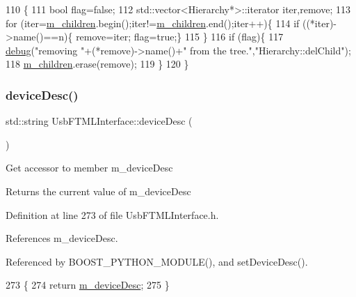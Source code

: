 \begin{DoxyCode}
110                                    \{
111   \textcolor{keywordtype}{bool} flag=\textcolor{keyword}{false};
112   std::vector<Hierarchy*>::iterator iter,\textcolor{keyword}{remove};
113   \textcolor{keywordflow}{for} (iter=\hyperlink{classHierarchy_a038816763941fd4a930504917f60483b}{m\_children}.begin();iter!=\hyperlink{classHierarchy_a038816763941fd4a930504917f60483b}{m\_children}.end();iter++)\{
114     \textcolor{keywordflow}{if} ((*iter)->name()==n)\{ \textcolor{keyword}{remove}=iter; flag=\textcolor{keyword}{true};\}
115   \}
116   \textcolor{keywordflow}{if} (flag)\{
117     \hyperlink{classObject_aac010553f022165573714b7014a15f0d}{debug}(\textcolor{stringliteral}{"removing "}+(*remove)->name()+\textcolor{stringliteral}{" from the tree."},\textcolor{stringliteral}{"Hierarchy::delChild"});
118     \hyperlink{classHierarchy_a038816763941fd4a930504917f60483b}{m\_children}.erase(\textcolor{keyword}{remove});
119   \}
120 \}
\end{DoxyCode}
\mbox{\label{classUsbFTMLInterface_ab541b4c57c1e7e947037acbfebc3fe3b}} 
\subsubsection{\texorpdfstring{device\+Desc()}{deviceDesc()}}
{\footnotesize\ttfamily std\+::string Usb\+F\+T\+M\+L\+Interface\+::device\+Desc (\begin{DoxyParamCaption}{ }\end{DoxyParamCaption})\hspace{0.3cm}{\ttfamily [inline]}}

Get accessor to member m\+\_\+device\+Desc \begin{DoxyReturn}{Returns}
the current value of m\+\_\+device\+Desc 
\end{DoxyReturn}


Definition at line 273 of file Usb\+F\+T\+M\+L\+Interface.\+h.



References m\+\_\+device\+Desc.



Referenced by B\+O\+O\+S\+T\+\_\+\+P\+Y\+T\+H\+O\+N\+\_\+\+M\+O\+D\+U\+L\+E(), and set\+Device\+Desc().


\begin{DoxyCode}
273                           \{
274     \textcolor{keywordflow}{return} \hyperlink{classUsbFTMLInterface_a15063a6d03335ec8988e41eb61a1ab9f}{m\_deviceDesc};
275   \}
\end{DoxyCode}
\mbox{\label{classObject_a2e3947f2870094c332d7454117f3ec63}} 
